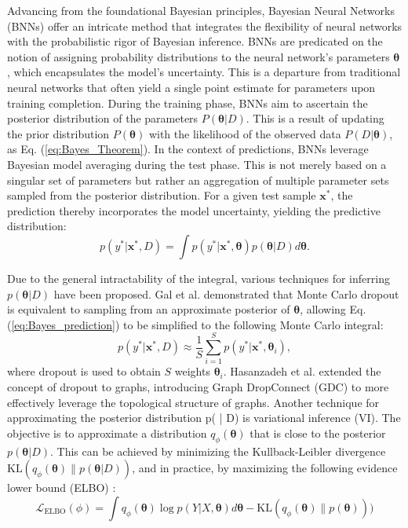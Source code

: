 Advancing from the foundational Bayesian principles, Bayesian Neural Networks (BNNs) offer an intricate method that integrates the flexibility of neural networks with the probabilistic rigor of Bayesian inference. 
BNNs are predicated on the notion of assigning probability distributions to the neural network's parameters $\boldsymbol{\theta}$, which encapsulates the model's uncertainty. 
This is a departure from traditional neural networks that often yield a single point estimate for parameters upon training completion.
During the training phase, BNNs aim to ascertain the posterior distribution of the parameters $P(\boldsymbol{\theta}|D)$. 
This is a result of updating the prior distribution $P(\boldsymbol{\theta})$ with the likelihood of the observed data $P(D|\boldsymbol{\theta})$, as Eq. (\ref{eq:Bayes_Theorem}).
In the context of predictions, BNNs leverage Bayesian model averaging during the test phase. 
This is not merely based on a singular set of parameters but rather an aggregation of multiple parameter sets sampled from the posterior distribution. 
For a given test sample $\mathbf{x}^*$, the prediction thereby incorporates the model uncertainty, yielding the predictive distribution:
\begin{equation}
    \label{eq:Bayes_prediction}
    p(y^* | \mathbf{x}^*, D) = \int p(y^* | \mathbf{x}^*, \boldsymbol{\theta}) p(\boldsymbol{\theta} | D) d\boldsymbol{\theta}.
\end{equation}

Due to the general intractability of the integral, various techniques for inferring $p(\boldsymbol{\theta} | D)$ have been proposed. 
Gal et al. \cite{gal2016dropout} demonstrated that Monte Carlo dropout is equivalent to sampling from an approximate posterior of $\boldsymbol{\theta}$, allowing Eq. (\ref{eq:Bayes_prediction}) to be simplified to the following Monte Carlo integral:
\begin{equation}
    \label{eq:Bayes_MC_dropout}
    p(y^* | \mathbf{x}^*, D) \approx \frac{1}{S} \sum^{S}_{i=1} p(y^* | \mathbf{x}^*, \boldsymbol{\theta}_i),
\end{equation}
where dropout is used to obtain $S$ weights $\boldsymbol{\theta}_i$. 
Hasanzadeh et al. \cite{hasanzadeh2020bayesian} extended the concept of dropout to graphs, introducing Graph DropConnect (GDC) to more effectively leverage the topological structure of graphs. 
Another technique for approximating the posterior distribution p(\boldsymbol{\theta} | D) is variational inference (VI). 
The objective is to approximate a distribution $q_{\phi}(\boldsymbol{\theta}) $ that is close to the posterior $p(\boldsymbol{\theta} | D)$. 
This can be achieved by minimizing the Kullback-Leibler divergence $\text{KL}(q_{\phi}(\boldsymbol{\theta}) \| p(\boldsymbol{\theta} | D))$, and in practice, by maximizing the following evidence lower bound (ELBO) \cite{blei2017variational}:
\begin{equation}
    \label{Bayesian_VI_ELBO}
    \mathcal{L}_{\text{ELBO}}(\phi)=\int q_{\phi}(\boldsymbol{\theta}) \log p(Y | X, \boldsymbol{\theta}) d\boldsymbol{\theta} - \text{KL}(q_{\phi}(\boldsymbol{\theta}) \| p(\boldsymbol{\theta})))
\end{equation}


